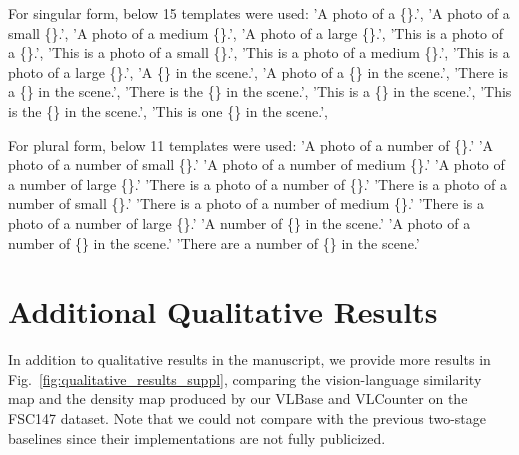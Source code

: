 For singular form, below 15 templates were used:\newline
'A photo of a \{\}.',\newline
'A photo of a small \{\}.',\newline
'A photo of a medium \{\}.',\newline
'A photo of a large \{\}.',\newline
'This is a photo of a \{\}.',\newline
'This is a photo of a small \{\}.',\newline
'This is a photo of a medium \{\}.',\newline
'This is a photo of a large \{\}.',\newline
'A \{\} in the scene.',\newline
'A photo of a \{\} in the scene.',\newline
'There is a \{\} in the scene.',\newline
'There is the \{\} in the scene.',\newline
'This is a \{\} in the scene.',\newline
'This is the \{\} in the scene.',\newline
'This is one \{\} in the scene.',\newline

For plural form, below 11 templates were used:\newline
'A photo of a number of \{\}.'\newline
'A photo of a number of small \{\}.'\newline
'A photo of a number of medium \{\}.'\newline
'A photo of a number of large \{\}.'\newline
'There is a photo of a number of \{\}.'\newline
'There is a photo of a number of small \{\}.'\newline
'There is a photo of a number of medium \{\}.'\newline
'There is a photo of a number of large \{\}.'\newline
'A number of \{\} in the scene.'\newline
'A photo of a number of \{\} in the scene.'\newline
'There are a number of \{\} in the scene.'\newline

\section{Additional Qualitative Results}
In addition to qualitative results in the manuscript, we provide more results in Fig.~\ref{fig:qualitative_results_suppl}, comparing the vision-language similarity map and the density map produced by our VLBase and VLCounter on the FSC147 dataset.
Note that we could not compare with the previous two-stage baselines since their implementations are not fully publicized.

